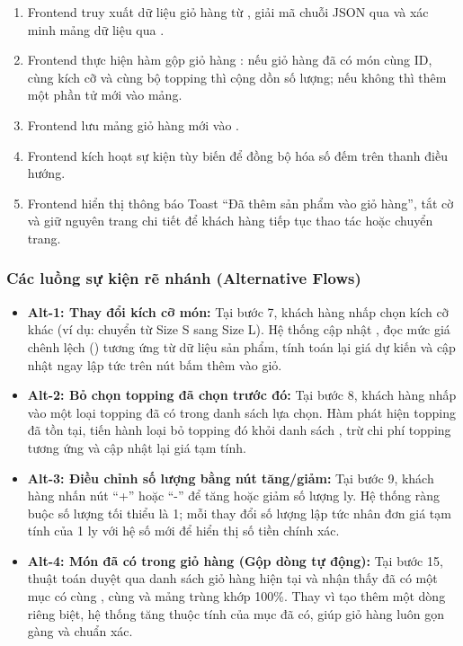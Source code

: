 \begin{enumerate}[label=\textbf{Bước \arabic*:}, leftmargin=4.2em]
  \item Frontend truy xuất dữ liệu giỏ hàng từ , giải mã chuỗi JSON qua  và xác minh mảng dữ liệu qua .
  \item Frontend thực hiện hàm gộp giỏ hàng : nếu giỏ hàng đã có món cùng ID, cùng kích cỡ và cùng bộ topping thì cộng dồn số lượng; nếu không thì thêm một phần tử mới vào mảng.
  \item Frontend lưu mảng giỏ hàng mới vào .
  \item Frontend kích hoạt sự kiện tùy biến  để đồng bộ hóa số đếm trên thanh điều hướng.
  \item Frontend hiển thị thông báo Toast ``Đã thêm sản phẩm vào giỏ hàng'', tắt cờ  và giữ nguyên trang chi tiết để khách hàng tiếp tục thao tác hoặc chuyển trang.
\end{enumerate}

\subsubsection{Các luồng sự kiện rẽ nhánh (Alternative Flows)}

\begin{itemize}[leftmargin=1.5em]
  \item \textbf{Alt-1: Thay đổi kích cỡ món:} Tại bước 7, khách hàng nhấp chọn kích cỡ khác (ví dụ: chuyển từ Size S sang Size L). Hệ thống cập nhật , đọc mức giá chênh lệch () tương ứng từ dữ liệu sản phẩm, tính toán lại giá dự kiến và cập nhật ngay lập tức trên nút bấm thêm vào giỏ.
  \item \textbf{Alt-2: Bỏ chọn topping đã chọn trước đó:} Tại bước 8, khách hàng nhấp vào một loại topping đã có trong danh sách lựa chọn. Hàm  phát hiện topping đã tồn tại, tiến hành loại bỏ topping đó khỏi danh sách , trừ chi phí topping tương ứng và cập nhật lại giá tạm tính.
  \item \textbf{Alt-3: Điều chỉnh số lượng bằng nút tăng/giảm:} Tại bước 9, khách hàng nhấn nút ``+'' hoặc ``-'' để tăng hoặc giảm số lượng ly. Hệ thống ràng buộc số lượng tối thiểu là 1; mỗi thay đổi số lượng lập tức nhân đơn giá tạm tính của 1 ly với hệ số mới để hiển thị số tiền chính xác.
  \item \textbf{Alt-4: Món đã có trong giỏ hàng (Gộp dòng tự động):} Tại bước 15, thuật toán  duyệt qua danh sách giỏ hàng hiện tại và nhận thấy đã có một mục có cùng , cùng  và mảng  trùng khớp 100\%. Thay vì tạo thêm một dòng riêng biệt, hệ thống tăng thuộc tính  của mục đã có, giúp giỏ hàng luôn gọn gàng và chuẩn xác.
\end{itemize}

